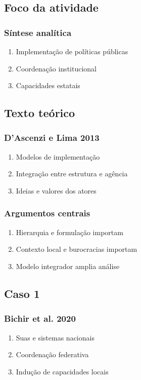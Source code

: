 \documentclass[12pt,a4paper]{article}
\begin{document}
\subsection{Foco da atividade}
\label{sec:org0c5e751}
\subsubsection{Síntese analítica}
\label{sec:org4e9c3c8}
\begin{enumerate}
\item Implementação de políticas públicas
\label{sec:org14bef0d}
\item Coordenação institucional
\label{sec:orga48e25a}
\item Capacidades estatais
\label{sec:orgf30d0ed}
\end{enumerate}
\subsection{Texto teórico}
\label{sec:org8e902b7}
\subsubsection{D'Ascenzi e Lima 2013}
\label{sec:org12b481a}
\begin{enumerate}
\item Modelos de implementação
\label{sec:orgf4f1c68}
\item Integração entre estrutura e agência
\label{sec:org02b1825}
\item Ideias e valores dos atores
\label{sec:orgc0a1ff6}
\end{enumerate}
\subsubsection{Argumentos centrais}
\label{sec:org89cfaf3}
\begin{enumerate}
\item Hierarquia e formulação importam
\label{sec:orge1c1d58}
\item Contexto local e burocracias importam
\label{sec:orga5fe48d}
\item Modelo integrador amplia análise
\label{sec:org684bb8f}
\end{enumerate}
\subsection{Caso 1}
\label{sec:orgec3c8e2}
\subsubsection{Bichir et al. 2020}
\label{sec:org39c0a9e}
\begin{enumerate}
\item Suas e sistemas nacionais
\label{sec:org72281f1}
\item Coordenação federativa
\label{sec:orge2b0322}
\item Indução de capacidades locais
\label{sec:orgb5a7f80}
\end{enumerate}
\end{document}
